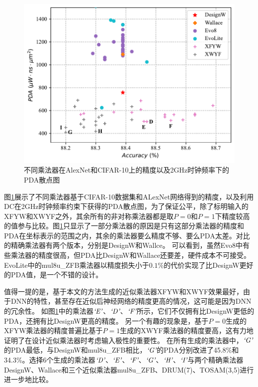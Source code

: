 \begin{figure}[!htb]
    \centering
    \includegraphics[width=0.9\linewidth]{figs/AC-AM-Adapt-AlexNet_CIFAR-10_PDA_accuracy.pdf}
    \caption{不同乘法器在AlexNet和CIFAR-10上的精度以及2GHz时钟频率下的PDA散点图}
    \label{AC:AM:Adapt:Fig:AlexNet_CIFAR-10_PDA_accuracy}
\end{figure}

图\ref{AC:AM:Adapt:Fig:AlexNet_CIFAR-10_PDA_accuracy}展示了不同乘法器基于CIFAR-10\cite{DNN:CIFAR-10}数据集和ALexNet网络\cite{DNN:AlexNet}得到的精度，以及利用DC在2GHz时钟频率约束下获得的PDA散点图，为了保证公平，除了标明输入的XFYW和XWYF之外，其余所有的非对称乘法器都是取$P=0$和$P=1$下精度较高的值参与比较。图\ref{AC:AM:Adapt:Fig:AlexNet_CIFAR-10_PDA_accuracy}只显示了一部分乘法器的原因是只有这部分乘法器的精度和PDA在坐标表示的范围之内，其余的乘法器要么精度不够、要么PDA太差。对比的精确乘法器有两个版本，分别是DesignW和Wallce。
可以看到，虽然Evo8中有些乘法器的精度很高，但PDA比DesignW和Wallace还要差，硬件成本不可接受。EvoLite中的mul8u\_ZFB乘法器以精度损失小于$0.1\%$的代价实现了比DesignW更好的PDA值，是一个不错的设计。

值得一提的是，基于本文的方法生成的近似乘法器XFYW和XWYF效果最好，由于DNN的特性，甚至存在近似后神经网络的精度更高的情况，这可能是因为DNN的冗余性。
如图\ref{AC:AM:Adapt:Fig:AlexNet_CIFAR-10_PDA_accuracy}中的乘法器$\emph{`E'}$、$\emph{`D'}$、$\emph{`F'}$所示，它们不仅拥有比DesignW更低的PDA，还拥有比DesignW更高的精度。
另一个有趣的现象是，基于$P=0$生成的XFYW乘法器的精度普遍比基于$P=1$生成的XWYF乘法器的精度要高，这有力地证明了在设计近似乘法器时考虑输入极性的重要性。
在所有生成的乘法器中，$\emph{`G'}$的PDA最低，与DesignW和mul8u\_ZFB相比，$\emph{`G'}$的PDA分别改进了45.8\%和34.3\%。选择6个生成的乘法器$\emph{`D'}$、$\emph{`E'}$、$\emph{`F'}$、$\emph{`G'}$、$\emph{`H'}$、$\emph{`I'}$与两个精确乘法器DesignW、Wallace和三个近似乘法器mul8u\_ZFB、DRUM(7)、TOSAM(3,5)进行进一步地比较。


